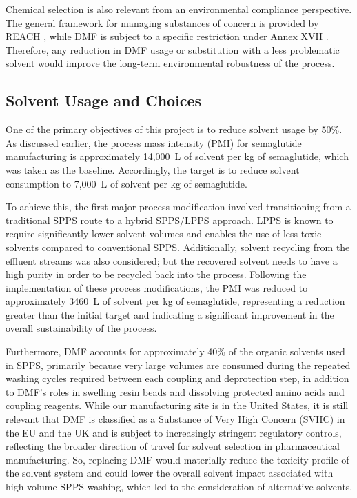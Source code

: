 Chemical selection is also relevant from an environmental compliance perspective. The general framework for managing substances of concern is provided by REACH \cite{EU_REACH_2006}, while DMF is subject to a specific restriction under Annex XVII \cite{EU_REACH_DMF_2021}. Therefore, any reduction in DMF usage or substitution with a less problematic solvent would improve the long-term environmental robustness of the process.

\subsection{Solvent Usage and Choices}
\label{sec:solvent_usage_choices}

One of the primary objectives of this project is to reduce solvent usage by 50\%. As discussed earlier, the process mass intensity (PMI) for semaglutide manufacturing is approximately 14,000~L of solvent per kg of semaglutide, which was taken as the baseline. Accordingly, the target is to reduce solvent consumption to 7,000~L of solvent per kg of semaglutide.

To achieve this, the first major process modification involved transitioning from a traditional SPPS route to a hybrid SPPS/LPPS approach. LPPS is known to require significantly lower solvent volumes and enables the use of less toxic solvents compared to conventional SPPS. Additionally, solvent recycling from the effluent streams was also considered; but the recovered solvent needs to have a high purity in order to be recycled back into the process. Following the implementation of these process modifications, the PMI was reduced to approximately 3460~L of solvent per kg of semaglutide, representing a reduction greater than the initial target and indicating a significant improvement in the overall sustainability of the process.

Furthermore, DMF accounts for approximately 40\% of the organic solvents used in SPPS, primarily because very large volumes are consumed during the repeated washing cycles required between each coupling and deprotection step, in addition to DMF's roles in swelling resin beads and dissolving protected amino acids and coupling reagents. While our manufacturing site is in the United States, it is still relevant that DMF is classified as a Substance of Very High Concern (SVHC) in the EU and the UK \cite{ECHA_SVHC} and is subject to increasingly stringent regulatory controls, reflecting the broader direction of travel for solvent selection in pharmaceutical manufacturing. So, replacing DMF would materially reduce the toxicity profile of the solvent system and could lower the overall solvent impact associated with high-volume SPPS washing, which led to the consideration of alternative solvents.


